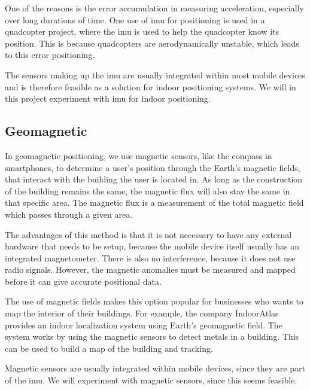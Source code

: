 One of the reasons is the error accumulation in measuring acceleration, especially over long durations of time. One use of \gls{imu} for positioning is used in a quadcopter project, where the \gls{imu} is used to help the quadcopter know its position. This is because quadcopters are aerodynamically unstable, which leads to this error positioning.\cite{IMUQuadcopter}

The sensors making up the \gls{imu} are usually integrated within most mobile devices and is therefore feasible as a solution for indoor positioning systems. We will in this project experiment with \gls{imu} for indoor positioning.

\subsection{Geomagnetic}
In geomagnetic positioning, we use magnetic sensors, like the compass in smartphones, to determine a user's position through the Earth's magnetic fields, that interact with the building the user is located in\cite{IPSMapsPeople}. As long as the construction of the building remains the same, the magnetic flux will also stay the same in that specific area. The magnetic flux is a measurement of the total magnetic field which passes through a given area.\cite{magneticflux}

The advantages of this method is that it is not necessary to have any external hardware that needs to be setup, because the mobile device itself usually has an integrated magnetometer. There is also no interference, because it does not use radio signals. However, the magnetic anomalies must be measured and mapped before it can give accurate positional data.\cite{magneticperformance}

The use of magnetic fields makes this option popular for businesses who wants to map the interior of their buildings\cite{magneticperformance}. For example, the company IndoorAtlas provides an indoor localization system using Earth's geomagnetic field. The system works by using the magnetic sensors to detect metals in a building. This can be used to build a map of the building and tracking.\cite{IndoorAtlas}

Magnetic sensors are usually integrated within mobile devices, since they are part of the \gls{imu}. We will experiment with magnetic sensors, since this seems feasible.

